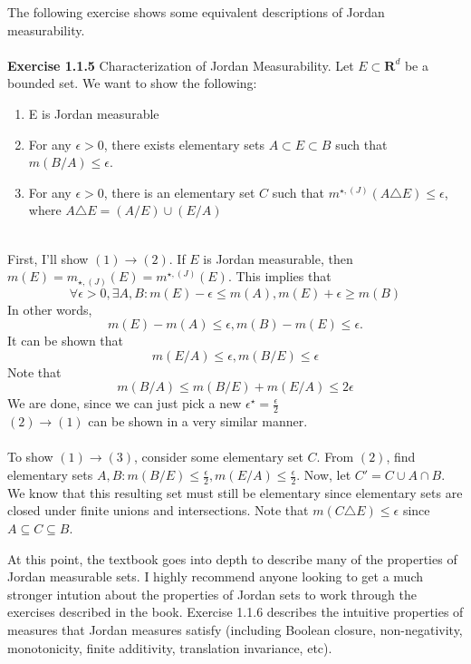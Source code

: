 \documentclass[answers,12pt]{exam}
\begin{document}
The following exercise shows some equivalent descriptions of Jordan measurability.
\\ \\
\textbf{Exercise 1.1.5} Characterization of Jordan Measurability.
Let $E \subset \mathbf{R}^d$ be a bounded set.
We want to show the following:
\begin{enumerate}
    \item E is Jordan measurable
    \item For any $\epsilon>0$, there exists elementary sets $A \subset E \subset B$ such that $m(B/A) \leq \epsilon$.
    \item For any $\epsilon > 0$, there is an elementary set $C$ such that $m^{\star, (J)}(A \triangle E) \leq \epsilon$, where $A \triangle E = (A/E) \cup (E/A)$
\end{enumerate}
\begin{solution}\\
    First, I'll show $(1) \rightarrow (2)$. 
    If $E$ is Jordan measurable, then $m(E) = m_{\star,(J)}(E)=m^{\star,(J)}(E)$. 
    This implies that 
    \[
        \forall \epsilon >0, \exists A,B: m(E)- \epsilon \leq m(A), m(E)+\epsilon \geq m(B)
    \]
    In other words, 
    \[
        m(E)-m(A) \leq \epsilon, m(B)-m(E) \leq \epsilon.
    \] 
    It can be shown that
    \[
        m(E/A) \leq \epsilon, m(B/E) \leq \epsilon
    \]
    Note that 
    \[
        m(B/A) \leq m(B/E) + m(E/A) \leq 2\epsilon
    \]
    We are done, since we can just pick a new $\epsilon^{\star}=\frac{\epsilon}{2}$
    \\
    $(2) \rightarrow (1)$ can be shown in a very similar manner.
    \\ \\
    To show $(1) \rightarrow (3)$, consider some elementary set $C$.
    From $(2)$, find elementary sets $A,B: m(B/E)\leq \frac{\epsilon}{2}, m(E/A) \leq \frac{\epsilon}{2}$.
    Now, let $C'= C \cup A \cap B$. We know that this resulting set must still be elementary since elementary sets are closed under finite unions and intersections.
    Note that $m(C \triangle E) \leq \epsilon$ since $A \subseteq C \subseteq B$.
\end{solution}

At this point, the textbook goes into depth to describe many of the properties of Jordan measurable sets.
I highly recommend anyone looking to get a much stronger intution about the properties of Jordan sets to work through the exercises described in the book.
Exercise 1.1.6 describes the intuitive properties of measures that Jordan measures satisfy (including Boolean closure, non-negativity, monotonicity, finite additivity, translation invariance, etc).
\end{document}
